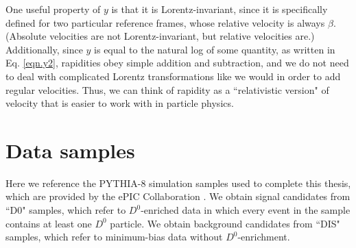 One useful property of $y$ is that it is Lorentz-invariant, since it is specifically defined for two particular reference frames, whose relative velocity is always $\beta$. (Absolute velocities are not Lorentz-invariant, but relative velocities are.) Additionally, since $y$ is equal to the natural log of some quantity, as written in Eq. \eqref{eqn.y2}, rapidities obey simple addition and subtraction, and we do not need to deal with complicated Lorentz transformations like we would in order to add regular velocities.  Thus, we can think of rapidity as a ``relativistic version" of velocity that is easier to work with in particle physics.



\chapter{Data samples}
\label{app.samples}

Here we reference the PYTHIA-8 simulation samples used to complete this thesis, which are provided by the ePIC Collaboration \cite{ePIC}. We obtain signal candidates from ``D0" samples, which refer to $D^0$-enriched data in which every event in the sample contains at least one $D^0$ particle. We obtain background candidates from ``DIS" samples, which refer to minimum-bias data without $D^0$-enrichment.

